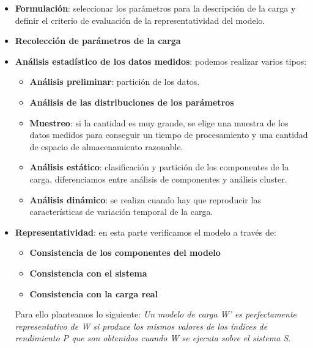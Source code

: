 \begin{itemize}
	\item \textbf{Formulación}: seleccionar los parámetros para la descripción de la carga y definir el criterio de evaluación de la representatividad del modelo.
	\item \textbf{Recolección de parámetros de la carga}
	\item \textbf{Análisis estadístico de los datos medidos}: podemos realizar varios tipos:
	
	\begin{itemize}
		\item \textbf{Análisis preliminar}: partición de los datos.
		\item \textbf{Análisis de las distribuciones de los parámetros}
		\item \textbf{Muestreo}: si la cantidad es muy grande, se elige una muestra de los datos medidos para conseguir un tiempo de procesamiento y una cantidad de espacio de almacenamiento razonable.
		\item \textbf{Análisis estático}: clasificación y partición de los componentes de la carga, diferenciamos entre análisis de componentes y análisis cluster.
		\item \textbf{Análisis dinámico}: se realiza cuando hay que reproducir las características de variación temporal de la carga.
	\end{itemize}
			
	\item \textbf{Representatividad}: en esta parte verificamos el modelo a través de:
	\begin{itemize}
		\item \textbf{Consistencia de los componentes del modelo}
		\item \textbf{Consistencia con el sistema}
		\item \textbf{Consistencia con la carga real}
	\end{itemize}
	Para ello planteamos lo siguiente:	\textit{Un modelo de carga W' es perfectamente representativo de W si produce los mismos valores de los índices de rendimiento P que son obtenidos cuando W se ejecuta sobre el sistema S}.
\end{itemize}
%



